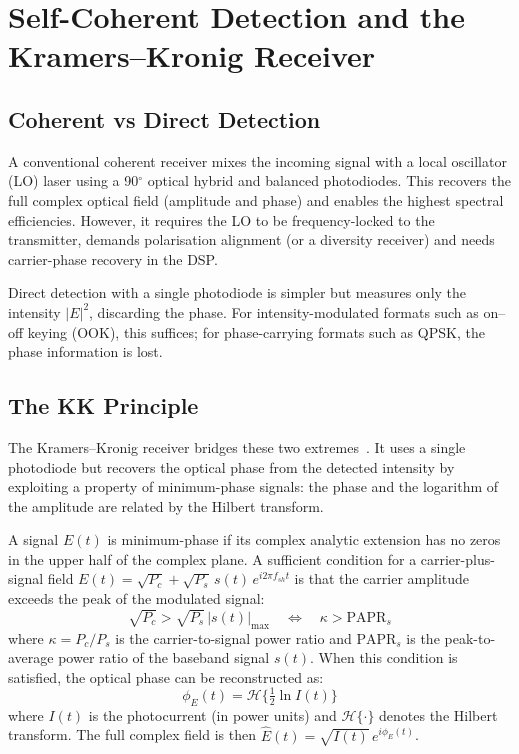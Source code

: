 \section{Self-Coherent Detection and the Kramers--Kronig Receiver}

\subsection{Coherent vs Direct Detection}

A conventional coherent receiver mixes the incoming signal with a local oscillator (LO) laser using a 90$^\circ$ optical hybrid and balanced photodiodes. This recovers the full complex optical field (amplitude and phase) and enables the highest spectral efficiencies. However, it requires the LO to be frequency-locked to the transmitter, demands polarisation alignment (or a diversity receiver) and needs carrier-phase recovery in the DSP.

Direct detection with a single photodiode is simpler but measures only the intensity $|E|^2$, discarding the phase. For intensity-modulated formats such as on--off keying (OOK), this suffices; for phase-carrying formats such as QPSK, the phase information is lost.

\subsection{The KK Principle}

The Kramers--Kronig receiver bridges these two extremes~\cite{mecozzi2016}. It uses a single photodiode but recovers the optical phase from the detected intensity by exploiting a property of minimum-phase signals: the phase and the logarithm of the amplitude are related by the Hilbert transform.

A signal $E(t)$ is minimum-phase if its complex analytic extension has no zeros in the upper half of the complex plane. A sufficient condition for a carrier-plus-signal field $E(t)=\sqrt{P_c}+\sqrt{P_s}\,s(t)\,e^{i2\pi f_{sh}t}$ is that the carrier amplitude exceeds the peak of the modulated signal:
\begin{equation}
\sqrt{P_c}>\sqrt{P_s}\,|s(t)|_{\max}\quad\Longleftrightarrow\quad \kappa>\mathrm{PAPR}_s
\end{equation}
where $\kappa=P_c/P_s$ is the carrier-to-signal power ratio and $\mathrm{PAPR}_s$ is the peak-to-average power ratio of the baseband signal $s(t)$. When this condition is satisfied, the optical phase can be reconstructed as:
\begin{equation}
\phi_E(t)=\mathcal{H}\!\Big\{\tfrac12\ln I(t)\Big\}
\end{equation}
where $I(t)$ is the photocurrent (in power units) and $\mathcal{H}\{\cdot\}$ denotes the Hilbert transform. The full complex field is then $\hat E(t)=\sqrt{I(t)}\,e^{i\phi_E(t)}$.

